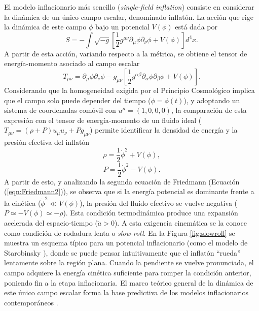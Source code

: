 El modelo inflacionario más sencillo (\textit{single-field inflation}) consiste en considerar la dinámica de un único campo escalar, denominado inflatón. La acción que rige la dinámica de este campo $\phi$ bajo un potencial $V(\phi)$ está dada por
\begin{equation}
    S = -\int \sqrt{-g} \left[ \frac{1}{2} g^{\mu\nu} \partial_\mu \phi \partial_\nu \phi + V(\phi) \right] d^4 x.
\end{equation}
A partir de esta acción, variando respecto a la métrica, se obtiene el tensor de energía-momento asociado al campo escalar
\begin{equation}
    T_{\mu \nu} = \partial_\mu \phi \partial_\nu \phi - g_{\mu \nu} \left[ \frac{1}{2} g^{\alpha \beta} \partial_\alpha \phi \partial_\beta \phi + V(\phi) \right].
\end{equation}
Considerando que la homogeneidad exigida por el Principio Cosmológico implica que el campo solo puede depender del tiempo ($\phi = \phi(t)$), y adoptando un sistema de coordenadas comóvil con $u^\mu = (1,0,0,0)$, la comparación de esta expresión con el tensor de energía-momento de un fluido ideal ($T_{\mu\nu} = (\rho + P) u_\mu u_\nu + P g_{\mu\nu}$) permite identificar la densidad de energía y la presión efectiva del inflatón
\begin{equation}
    \rho = \frac{1}{2} \dot{\phi}^2 + V(\phi),
\end{equation}
\begin{equation}
    P = \frac{1}{2} \dot{\phi}^2 - V(\phi).
\end{equation}
A partir de esto, y analizando la segunda ecuación de Friedmann (Ecuación (\ref{eqn:Friedmann2})), se observa que si la energía potencial es dominante frente a la cinética ($\dot{\phi}^2 \ll V(\phi)$), la presión del fluido efectivo se vuelve negativa ($P \simeq -V(\phi) \simeq -\rho$). Esta condición termodinámica produce una expansión acelerada del espacio-tiempo ($\ddot{a} > 0$). A esta exigencia cinemática se la conoce como condición de rodadura lenta o \textit{slow-roll}. En la Figura \ref{fig:slowroll} se muestra un esquema típico para un potencial inflacionario (como el modelo de Starobinsky \cite{Starobinsky_1980}), donde se puede pensar intuitivamente que el inflatón ``rueda'' lentamente sobre la región plana. Cuando la pendiente se vuelve pronunciada, el campo adquiere la energía cinética suficiente para romper la condición anterior, poniendo fin a la etapa inflacionaria. El marco teórico general de la dinámica de este único campo escalar forma la base predictiva de los modelos inflacionarios contemporáneos \cite{Baumann_2012, Weinberg, Doddelson, Ellis_2026}.

